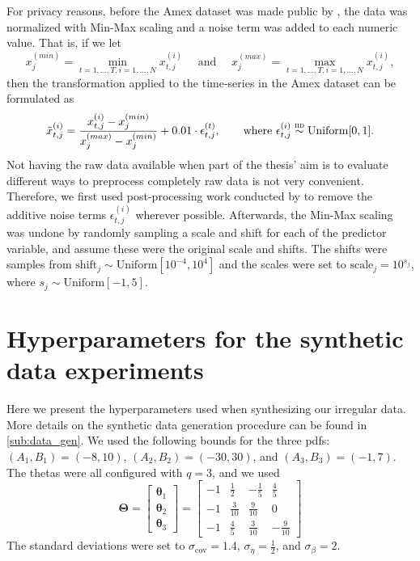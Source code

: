 \documentclass{statsmsc}
\begin{document}
{For privacy reasons, before the Amex dataset was made public by \cite{amex-data}, the data was
normalized with Min-Max scaling and a noise term was added to each numeric value. That is,
if we let 
\begin{equation}
    x_j^{(min)}=\min_{t=1,\dots,T,i=1,\dots,N} x_{t,j}^{(i)}
    \quad \textrm{ and }\quad
    x_j^{(max)}=\max_{t=1,\dots,T,i=1,\dots,N} x_{t,j}^{(i)},
\end{equation}
then the transformation applied to the time-series in the Amex dataset can be formulated as
\begin{equation}
    \tilde{x}_{t,j}^{(i)} = \frac{x_{t,j}^{(i)}-x_j^{(min)}}{x_j^{(max)}-x_j^{(min)}}+0.01\cdot\epsilon_{t,j}^{(t)},
    \qquad \textrm{where }\epsilon_{t,j}^{(i)} \stackrel{\textsc{iid}}{\sim} \textrm{Uniform}[0,1].
\end{equation}
Not having the raw data available when part of the thesis' aim is to evaluate different ways to
preprocess completely raw data is not very convenient. Therefore, we first used post-processing
work conducted by \cite{raddar} to remove the additive noise terms $\epsilon_{t,j}^{(i)}$ wherever
possible. Afterwards, the Min-Max scaling was undone by randomly sampling a scale and shift
for each of the predictor variable, and assume these were the original scale and shifts.
The shifts were samples from $\textrm{shift}_j\sim\textrm{Uniform}[10^{-4}, 10^{4}]$ and the
scales were set to $\textrm{scale}_j=10^{s_j}$, where $s_j\sim\textrm{Uniform}[-1, 5]$.


\chapter{Hyperparameters for the synthetic data experiments}%
\label{ch:synth_data_appendix}

Here we present the hyperparameters used when synthesizing our irregular data. More details
on the synthetic data generation procedure can be found in \cref{sub:data_gen}.
We used the following bounds for the three \acp{pdf}:
$(A_1,B_1)=(-8, 10)$, $(A_2,B_2)=(-30, 30)$, and $(A_3, B_3)=(-1, 7)$.
The thetas were all configured with $q=3$, and we used
\begin{equation}
    \bm\Theta=\begin{bmatrix}
        \bm\theta_1 \\
        \bm\theta_2 \\
        \bm\theta_3
    \end{bmatrix}
    =
    \begin{bmatrix}
        -1 & \frac{1}{2} & -\frac{1}{5} & \frac{4}{5} \\
        -1 & \frac{3}{10} & \frac{9}{10} & 0 \\
        -1 & \frac{4}{5} & \frac{3}{10} & -\frac{9}{10} 
    \end{bmatrix}
\end{equation}
The standard deviations were set to
$\sigma_{\textrm{cov}}=1.4$, $\sigma_{\eta}=\frac{1}{2}$, and $\sigma_\beta=2$.

}
\end{document}

